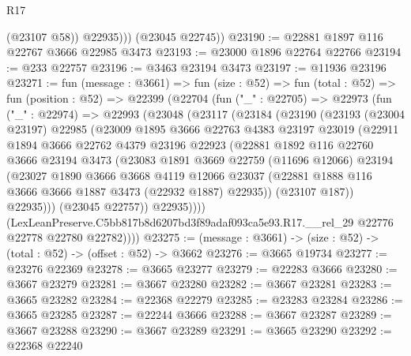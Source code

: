 \begin{lexlean}{R17}
\begin{coremodule}
              (@23107 @58))
            @22935)))
      (@23045 @22745))
@23190 := @22881 @1897 @116 @22767 @3666 @22985 @3473
@23193 := @23000 @1896 @22764 @22766
@23194 := @233 @22757
@23196 := @3463 @23194 @3473
@23197 := @11936 @23196
@23271 := fun (message : @3661) =>
  fun (size : @52) =>
  fun (total : @52) =>
  fun (position : @52) =>
  @22399
    (@22704
      (fun ("_" : @22705) =>
      @22973
        (fun ("_" : @22974) =>
        @22993
          (@23048
            (@23117
              (@23184
                (@23190
                  (@23193
                    (@23004 @23197)
                    @22985
                    (@23009
                      @1895
                      @3666
                      @22763
                      @4383
                      @23197
                      @23019
                      (@22911
                        @1894
                        @3666
                        @22762
                        @4379
                        @23196
                        @22923
                        (@22881
                          @1892
                          @116
                          @22760
                          @3666
                          @23194
                          @3473
                          (@23083
                            @1891
                            @3669
                            @22759
                            (@11696 @12066)
                            @23194
                            (@23027
                              @1890
                              @3666
                              @3668
                              @4119
                              @12066
                              @23037
                              (@22881 @1888 @116 @3666 @3666 @1887 @3473 (@22932 @1887) @22935))
                            (@23107 @187))
                          @22935)))
                    (@23045 @22757))
                  @22935))))
          (LexLeanPreserve.C5bb817b8d6207bd3f89adaf093ca5e93.R17.__rel_29
            @22776
            @22778
            @22780
            @22782))))
@23275 := (message : @3661) -> (size : @52) -> (total : @52) -> (offset : @52) -> @3662
@23276 := @3665 @19734
@23277 := @23276 @22369
@23278 := @3665 @23277
@23279 := @22283 @3666
@23280 := @3667 @23279
@23281 := @3667 @23280
@23282 := @3667 @23281
@23283 := @3665 @23282
@23284 := @22368 @22279
@23285 := @23283 @23284
@23286 := @3665 @23285
@23287 := @22244 @3666
@23288 := @3667 @23287
@23289 := @3667 @23288
@23290 := @3667 @23289
@23291 := @3665 @23290
@23292 := @22368 @22240

\end{coremodule}
\end{lexlean}
